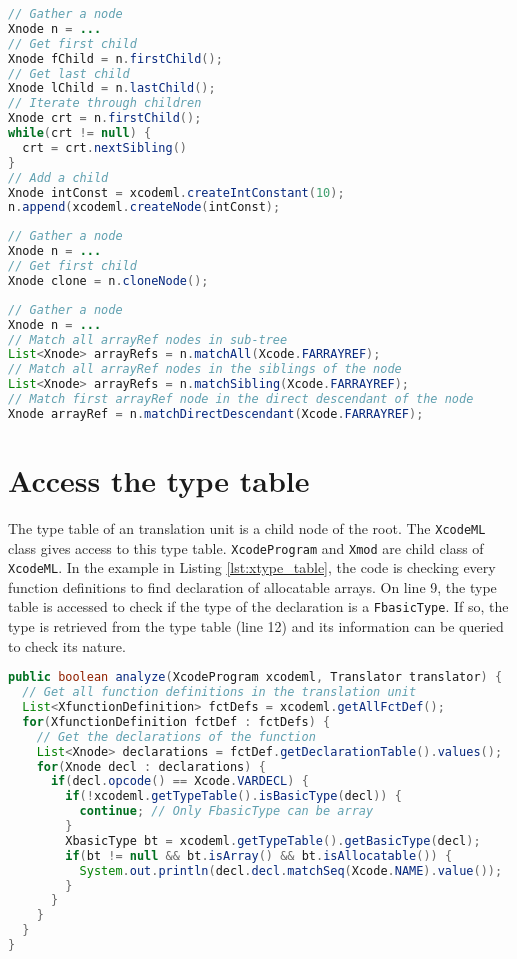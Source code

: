 \begin{lstlisting}[label=lst:xnode_node, language=Java, caption=XtypeTable]
// Gather a node
Xnode n = ...
// Get first child
Xnode fChild = n.firstChild();
// Get last child
Xnode lChild = n.lastChild();
// Iterate through children
Xnode crt = n.firstChild();
while(crt != null) {
  crt = crt.nextSibling()
}
// Add a child
Xnode intConst = xcodeml.createIntConstant(10);
n.append(xcodeml.createNode(intConst);
\end{lstlisting}

\begin{lstlisting}[label=lst:xnode_clone, language=Java, caption=XtypeTable]
// Gather a node
Xnode n = ...
// Get first child
Xnode clone = n.cloneNode();
\end{lstlisting}

\begin{lstlisting}[label=lst:xnode_match, language=Java, caption=XtypeTable]
// Gather a node
Xnode n = ...
// Match all arrayRef nodes in sub-tree
List<Xnode> arrayRefs = n.matchAll(Xcode.FARRAYREF);
// Match all arrayRef nodes in the siblings of the node
List<Xnode> arrayRefs = n.matchSibling(Xcode.FARRAYREF);
// Match first arrayRef node in the direct descendant of the node
Xnode arrayRef = n.matchDirectDescendant(Xcode.FARRAYREF);
\end{lstlisting}

\section{Access the type table}
The type table of an \xcodeml translation unit is a child node of the root. 
The \lstinline|XcodeML| class gives access to this type table. 
\lstinline|XcodeProgram| and \lstinline|Xmod| are child class of 
\lstinline|XcodeML|. 
In the example in Listing \ref{lst:xtype_table}, the code is checking
every function definitions to find declaration of allocatable arrays.
On line 9, the type table is accessed to check if the type of the 
declaration is a \lstinline|FbasicType|. If so, the type is retrieved from
the type table (line 12) and its information can be queried to check its
nature.

\begin{lstlisting}[label=lst:xtype_table, language=Java, caption=XtypeTable]
public boolean analyze(XcodeProgram xcodeml, Translator translator) {
  // Get all function definitions in the translation unit
  List<XfunctionDefinition> fctDefs = xcodeml.getAllFctDef();
  for(XfunctionDefinition fctDef : fctDefs) {
    // Get the declarations of the function
    List<Xnode> declarations = fctDef.getDeclarationTable().values();
    for(Xnode decl : declarations) {
      if(decl.opcode() == Xcode.VARDECL) {
        if(!xcodeml.getTypeTable().isBasicType(decl)) {
          continue; // Only FbasicType can be array
        }
        XbasicType bt = xcodeml.getTypeTable().getBasicType(decl);
        if(bt != null && bt.isArray() && bt.isAllocatable()) {
          System.out.println(decl.decl.matchSeq(Xcode.NAME).value());
        }
      }
    }
  }
}
\end{lstlisting}



